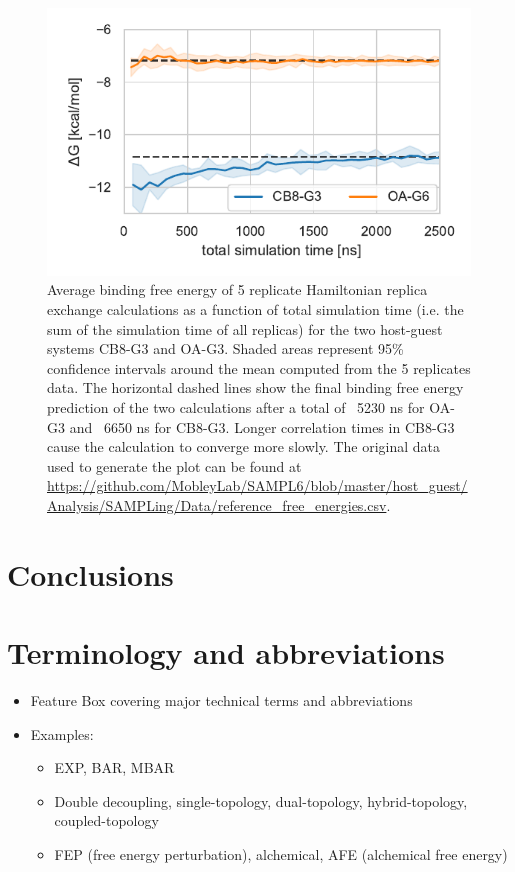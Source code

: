 \documentclass[9pt,bestpractices]{livecoms}
\begin{document}
\begin{figure}
    \includegraphics[width=0.95\linewidth]{figures/fig9_convergence/Figure.pdf}
    \caption{Average binding free energy of 5 replicate Hamiltonian replica exchange calculations as a function of total simulation time (i.e. the sum of the simulation time of all replicas) for the two host-guest systems CB8-G3 and OA-G3. Shaded areas represent 95\% confidence intervals around the mean computed from the 5 replicates data. The horizontal dashed lines show the final binding free energy prediction of the two calculations after a total of ~5230 ns for OA-G3 and ~6650 ns for CB8-G3. Longer correlation times in CB8-G3 cause the calculation to converge more slowly. The original data used to generate the plot can be found at \url{https://github.com/MobleyLab/SAMPL6/blob/master/host_guest/Analysis/SAMPLing/Data/reference_free_energies.csv}.
}
    \label{fig:freeenergytrajectories}
\end{figure}

\section{Conclusions}

\section{Terminology and abbreviations}
\label{sec:tem-abbrev}
\begin{itemize}
\item Feature Box covering major technical terms and abbreviations
\item Examples:
\begin{itemize}
\item EXP, BAR, MBAR
\item Double decoupling, single-topology, dual-topology, hybrid-topology, coupled-topology
\item FEP (free energy perturbation), alchemical, AFE (alchemical free energy)
\end{itemize}
\end{itemize}
\end{document}
